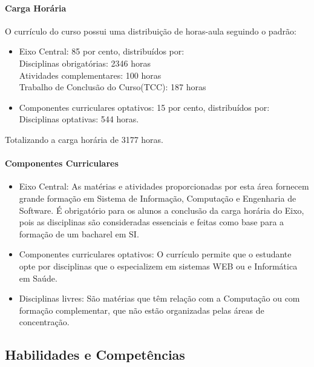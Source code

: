 \paragraph{Carga Horária}
       O currículo do curso possui uma distribuição de horas-aula seguindo o padrão:
       \begin{itemize}
           \item Eixo Central: 85 por cento, distribuídos por:\\
                Disciplinas obrigatórias: 2346 horas\\
                Atividades complementares: 100 horas\\
                Trabalho de Conclusão do Curso(TCC): 187 horas\\
           \item Componentes curriculares optativos: 15 por cento, distribuídos por:\\
                Disciplinas optativas: 544 horas.\\
            \end{itemize}
        Totalizando a carga horária de 3177 horas.
    
 \paragraph{Componentes Curriculares}
     \begin{itemize}
            \item Eixo Central: As matérias e atividades proporcionadas por esta área fornecem grande formação em Sistema de Informação, Computação e Engenharia de Software. É obrigatório para os alunos a conclusão da carga horária do Eixo, pois as disciplinas são consideradas essenciais e feitas como base para a formação de um bacharel em SI.
            \item Componentes curriculares optativos:
        O currículo permite que o estudante opte por disciplinas que o especializem em sistemas WEB ou e Informática em Saúde.
            \item Disciplinas livres:
        São matérias que têm relação com a Computação ou com formação complementar, que não estão organizadas pelas áreas de concentração.
        \end{itemize}
    
\subsection{Habilidades e Competências}

